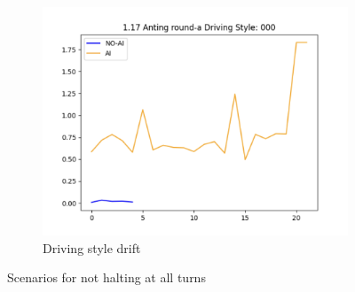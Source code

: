 \documentclass{article}
\begin{document}
\begin{figure}[htbp]
\begin{subfigure}[t]{0.3\textwidth}
		\centering
		\includegraphics[width=\textwidth]{images/openroad_mm_000_style.png}
		\caption{Driving style drift}\label{fig:openroad mm 000 style}
	\end{subfigure}
	\caption{Scenarios for not halting at all turns\label{fig:open road mm 000}}
\end{figure}
\end{document}
